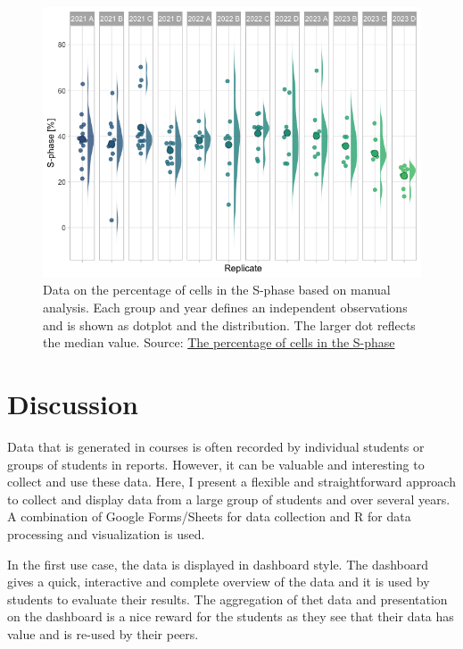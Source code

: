 \documentclass[
]{agujournal2019}
\begin{document}
\begin{figure}[H]

{\centering \includegraphics{index_files/figure-latex/fig-superplot-output-2.png}

}

\caption{\label{fig-superplot}Data on the percentage of cells in the
S-phase based on manual analysis. Each group and year defines an
independent observations and is shown as dotplot and the distribution.
The larger dot reflects the median value. Source:
\href{https://JoachimGoedhart.github.io/MS-StudentSourcing/notebooks/PreciSe.qmd.html\#cell-fig-superplot}{The
percentage of cells in the S-phase}}

\end{figure}

\hypertarget{sec-discussion}{%
\section*{Discussion}\label{sec-discussion}}

Data that is generated in courses is often recorded by individual
students or groups of students in reports. However, it can be valuable
and interesting to collect and use these data. Here, I present a
flexible and straightforward approach to collect and display data from a
large group of students and over several years. A combination of Google
Forms/Sheets for data collection and R for data processing and
visualization is used.

In the first use case, the data is displayed in dashboard style. The
dashboard gives a quick, interactive and complete overview of the data
and it is used by students to evaluate their results. The aggregation of
thet data and presentation on the dashboard is a nice reward for the
students as they see that their data has value and is re-used by their
peers.
\end{document}
